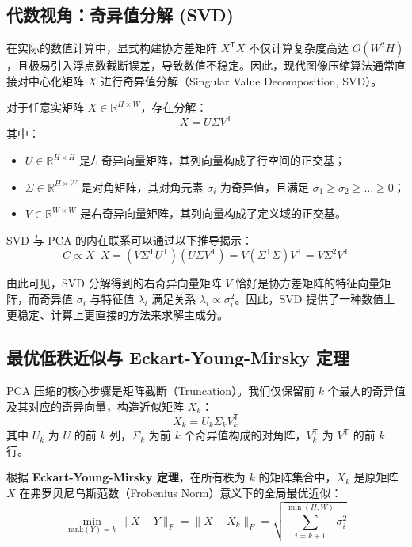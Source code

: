 \documentclass[12pt,a4paper]{article}
\begin{document}
\subsection{代数视角：奇异值分解 (SVD)}
在实际的数值计算中，显式构建协方差矩阵 $X^\mathsf{T} X$ 不仅计算复杂度高达 $O(W^2 H)$，且极易引入浮点数截断误差，导致数值不稳定。因此，现代图像压缩算法通常直接对中心化矩阵 $X$ 进行奇异值分解（Singular Value Decomposition, SVD）。

对于任意实矩阵 $X \in \mathbb{R}^{H \times W}$，存在分解：
\begin{equation}
    X = U \Sigma V^\mathsf{T}
\end{equation}
其中：
\begin{itemize}
    \item $U \in \mathbb{R}^{H \times H}$ 是左奇异向量矩阵，其列向量构成了行空间的正交基；
    \item $\Sigma \in \mathbb{R}^{H \times W}$ 是对角矩阵，其对角元素 $\sigma_i$ 为奇异值，且满足 $\sigma_1 \ge \sigma_2 \ge \dots \ge 0$；
    \item $V \in \mathbb{R}^{W \times W}$ 是右奇异向量矩阵，其列向量构成了定义域的正交基。
\end{itemize}

SVD 与 PCA 的内在联系可以通过以下推导揭示：
\begin{equation}
    C \propto X^\mathsf{T} X = (V \Sigma^\mathsf{T} U^\mathsf{T})(U \Sigma V^\mathsf{T}) = V (\Sigma^\mathsf{T} \Sigma) V^\mathsf{T} = V \Sigma^2 V^\mathsf{T}
\end{equation}

由此可见，SVD 分解得到的右奇异向量矩阵 $V$ 恰好是协方差矩阵的特征向量矩阵，而奇异值 $\sigma_i$ 与特征值 $\lambda_i$ 满足关系 $\lambda_i \propto \sigma_i^2$。因此，SVD 提供了一种数值上更稳定、计算上更直接的方法来求解主成分。

\subsection{最优低秩近似与 Eckart-Young-Mirsky 定理}
PCA 压缩的核心步骤是矩阵截断（Truncation）。我们仅保留前 $k$ 个最大的奇异值及其对应的奇异向量，构造近似矩阵 $X_k$：
\begin{equation}
    X_k = U_k \Sigma_k V_k^\mathsf{T}
\end{equation}
其中 $U_k$ 为 $U$ 的前 $k$ 列，$\Sigma_k$ 为前 $k$ 个奇异值构成的对角阵，$V_k^\mathsf{T}$ 为 $V^\mathsf{T}$ 的前 $k$ 行。

根据 \textbf{Eckart-Young-Mirsky 定理}，在所有秩为 $k$ 的矩阵集合中，$X_k$ 是原矩阵 $X$ 在弗罗贝尼乌斯范数（Frobenius Norm）意义下的全局最优近似：
\begin{equation}
    \min_{\text{rank}(Y)=k} \|X - Y\|_F = \|X - X_k\|_F = \sqrt{\sum_{i=k+1}^{\min(H,W)} \sigma_i^2}
\end{equation}
\end{document}

